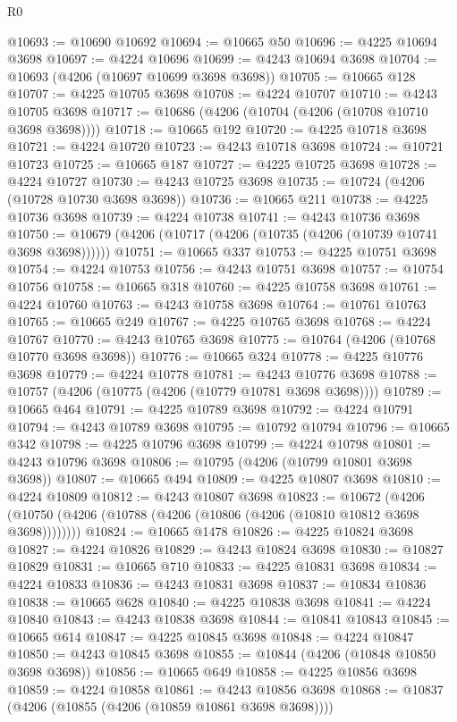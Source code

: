 \begin{lexlean}{R0}
\begin{coremodule}
@10693 := @10690 @10692
@10694 := @10665 @50
@10696 := @4225 @10694 @3698
@10697 := @4224 @10696
@10699 := @4243 @10694 @3698
@10704 := @10693 (@4206 (@10697 @10699 @3698 @3698))
@10705 := @10665 @128
@10707 := @4225 @10705 @3698
@10708 := @4224 @10707
@10710 := @4243 @10705 @3698
@10717 := @10686 (@4206 (@10704 (@4206 (@10708 @10710 @3698 @3698))))
@10718 := @10665 @192
@10720 := @4225 @10718 @3698
@10721 := @4224 @10720
@10723 := @4243 @10718 @3698
@10724 := @10721 @10723
@10725 := @10665 @187
@10727 := @4225 @10725 @3698
@10728 := @4224 @10727
@10730 := @4243 @10725 @3698
@10735 := @10724 (@4206 (@10728 @10730 @3698 @3698))
@10736 := @10665 @211
@10738 := @4225 @10736 @3698
@10739 := @4224 @10738
@10741 := @4243 @10736 @3698
@10750 := @10679 (@4206 (@10717 (@4206 (@10735 (@4206 (@10739 @10741 @3698 @3698))))))
@10751 := @10665 @337
@10753 := @4225 @10751 @3698
@10754 := @4224 @10753
@10756 := @4243 @10751 @3698
@10757 := @10754 @10756
@10758 := @10665 @318
@10760 := @4225 @10758 @3698
@10761 := @4224 @10760
@10763 := @4243 @10758 @3698
@10764 := @10761 @10763
@10765 := @10665 @249
@10767 := @4225 @10765 @3698
@10768 := @4224 @10767
@10770 := @4243 @10765 @3698
@10775 := @10764 (@4206 (@10768 @10770 @3698 @3698))
@10776 := @10665 @324
@10778 := @4225 @10776 @3698
@10779 := @4224 @10778
@10781 := @4243 @10776 @3698
@10788 := @10757 (@4206 (@10775 (@4206 (@10779 @10781 @3698 @3698))))
@10789 := @10665 @464
@10791 := @4225 @10789 @3698
@10792 := @4224 @10791
@10794 := @4243 @10789 @3698
@10795 := @10792 @10794
@10796 := @10665 @342
@10798 := @4225 @10796 @3698
@10799 := @4224 @10798
@10801 := @4243 @10796 @3698
@10806 := @10795 (@4206 (@10799 @10801 @3698 @3698))
@10807 := @10665 @494
@10809 := @4225 @10807 @3698
@10810 := @4224 @10809
@10812 := @4243 @10807 @3698
@10823 := @10672
    (@4206 (@10750 (@4206 (@10788 (@4206 (@10806 (@4206 (@10810 @10812 @3698 @3698))))))))
@10824 := @10665 @1478
@10826 := @4225 @10824 @3698
@10827 := @4224 @10826
@10829 := @4243 @10824 @3698
@10830 := @10827 @10829
@10831 := @10665 @710
@10833 := @4225 @10831 @3698
@10834 := @4224 @10833
@10836 := @4243 @10831 @3698
@10837 := @10834 @10836
@10838 := @10665 @628
@10840 := @4225 @10838 @3698
@10841 := @4224 @10840
@10843 := @4243 @10838 @3698
@10844 := @10841 @10843
@10845 := @10665 @614
@10847 := @4225 @10845 @3698
@10848 := @4224 @10847
@10850 := @4243 @10845 @3698
@10855 := @10844 (@4206 (@10848 @10850 @3698 @3698))
@10856 := @10665 @649
@10858 := @4225 @10856 @3698
@10859 := @4224 @10858
@10861 := @4243 @10856 @3698
@10868 := @10837 (@4206 (@10855 (@4206 (@10859 @10861 @3698 @3698))))

\end{coremodule}
\end{lexlean}
